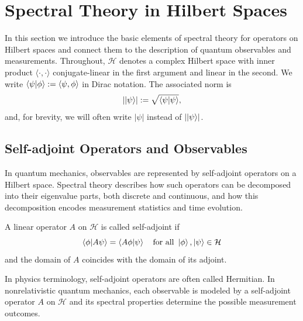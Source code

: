 \section{Spectral Theory in Hilbert Spaces}\label{sec:spectral_theory_in_hilbert_spaces}
In this section we introduce the basic elements of spectral theory for operators on Hilbert spaces and connect them to the description of quantum observables and measurements. Throughout, $\mathcal{H}$ denotes a complex Hilbert space with inner product $\langle\cdot,\cdot\rangle$ conjugate-linear in the first argument and linear in the second. We write $\braket{\psi|\phi}:=\langle\psi,\phi\rangle$ in Dirac notation. The associated norm is
\begin{equation}
\lvert\ket{\psi}\rvert := \sqrt{\braket{\psi|\psi}},
\end{equation}
and, for brevity, we will often write $\lvert\psi\rvert$ instead of $\lvert\ket{\psi}\rvert$.
\subsection{Self-adjoint Operators and Observables}\label{sec:self_adjoint_operators_and_observables}
In quantum mechanics, observables are represented by self-adjoint operators on a Hilbert space.\supercite{1378551877,1423848155} Spectral theory describes how such operators can be decomposed into their eigenvalue parts, both discrete and continuous, and how this decomposition encodes measurement statistics and time evolution.
\begin{definition}
A linear operator $A$ on $\mathcal{H}$ is called self-adjoint if
\begin{equation}
\braket{\phi|A\psi}=\braket{A\phi|\psi}\quad\text{for all }\ket{\phi},\ket{\psi}\in\mathcal{H}
\end{equation}
and the domain of $A$ coincides with the domain of its adjoint.
\end{definition}
In physics terminology, self-adjoint operators are often called Hermitian. In nonrelativistic quantum mechanics, each observable is modeled by a self-adjoint operator $A$ on $\mathcal{H}$ and its spectral properties determine the possible measurement outcomes.

